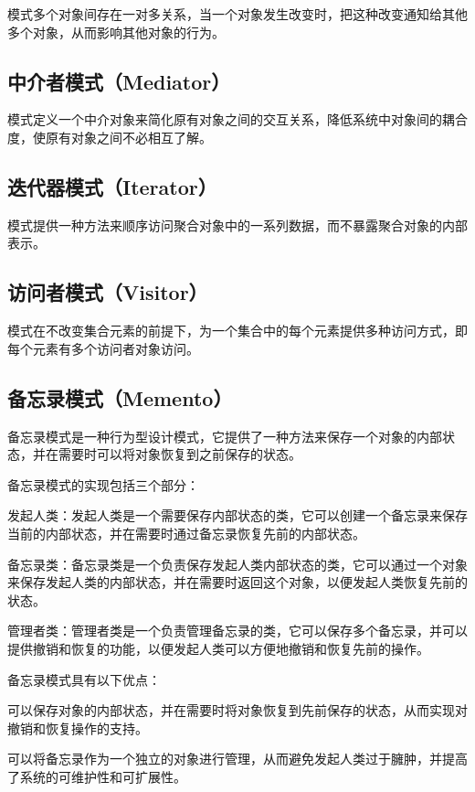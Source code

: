 \documentclass[cn,black,12pt,normal]{elegantnote}
\begin{document}
模式多个对象间存在一对多关系，当一个对象发生改变时，把这种改变通知给其他多个对象，从而影响其他对象的行为。

\subsection{中介者模式（Mediator）}

模式定义一个中介对象来简化原有对象之间的交互关系，降低系统中对象间的耦合度，使原有对象之间不必相互了解。


\subsection{迭代器模式（Iterator）}

模式提供一种方法来顺序访问聚合对象中的一系列数据，而不暴露聚合对象的内部表示。


\subsection{访问者模式（Visitor）}

模式在不改变集合元素的前提下，为一个集合中的每个元素提供多种访问方式，即每个元素有多个访问者对象访问。


\subsection{备忘录模式（Memento）}

备忘录模式是一种行为型设计模式，它提供了一种方法来保存一个对象的内部状态，并在需要时可以将对象恢复到之前保存的状态。

备忘录模式的实现包括三个部分：

发起人类：发起人类是一个需要保存内部状态的类，它可以创建一个备忘录来保存当前的内部状态，并在需要时通过备忘录恢复先前的内部状态。

备忘录类：备忘录类是一个负责保存发起人类内部状态的类，它可以通过一个对象来保存发起人类的内部状态，并在需要时返回这个对象，以便发起人类恢复先前的状态。

管理者类：管理者类是一个负责管理备忘录的类，它可以保存多个备忘录，并可以提供撤销和恢复的功能，以便发起人类可以方便地撤销和恢复先前的操作。

备忘录模式具有以下优点：

可以保存对象的内部状态，并在需要时将对象恢复到先前保存的状态，从而实现对撤销和恢复操作的支持。

可以将备忘录作为一个独立的对象进行管理，从而避免发起人类过于臃肿，并提高了系统的可维护性和可扩展性。
\end{document}
